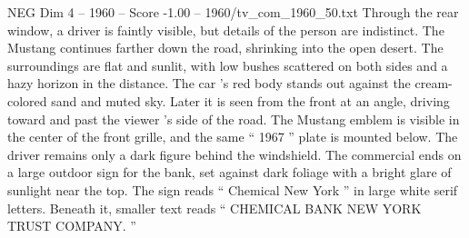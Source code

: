 \begin{textsample}{NEG Dim 4 – 1960 – Score -1.00 – 1960/tv\_com\_1960\_50.txt}
Through the rear window, a driver is faintly visible, but details of the person are indistinct.
The Mustang continues farther down the road, shrinking into the open desert.
The surroundings are flat and sunlit, with low bushes scattered on both sides and a hazy horizon in the distance.
The car ’s red body stands out against the cream-colored sand and muted sky.
Later it is seen from the front at an angle, driving toward and past the viewer ’s side of the road.
The Mustang emblem is visible in the center of the front grille, and the same “ 1967 ” plate is mounted below.
The driver remains only a dark figure behind the windshield.
The commercial ends on a large outdoor sign for the bank, set against dark foliage with a bright glare of sunlight near the top.
The sign reads “ Chemical New York ” in large white serif letters.
Beneath it, smaller text reads “ CHEMICAL BANK NEW YORK TRUST COMPANY. ”

\end{textsample}
